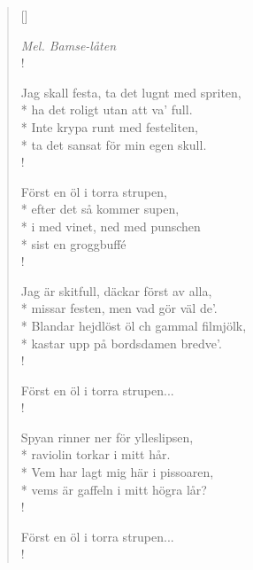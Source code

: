
\settowidth{\versewidth}{Inte krypa runt med festeliten,}



\begin{verse}[\versewidth]

\flagverse{}
\emph{Mel. Bamse-låten}\\!

Jag skall festa, ta det lugnt med spriten,\\*
ha det roligt utan att va' full.\\*
Inte krypa runt med festeliten,\\*
ta det sansat för min egen skull.\\!


Först en öl i torra strupen,\\*
efter det så kommer supen,\\*
i med vinet, ned med punschen\\*
sist en groggbuffé\\!


Jag är skitfull, däckar först av alla,\\*
missar festen, men vad gör väl de'.\\*
Blandar hejdlöst öl ch gammal filmjölk,\\*
kastar upp på bordsdamen bredve'.\\!


Först en öl i torra strupen...\\!


Spyan rinner ner för ylleslipsen,\\*
raviolin torkar i mitt hår.\\*
Vem har lagt mig här i pissoaren,\\*
vems är gaffeln i mitt högra lår?\\!


Först en öl i torra strupen...\\!




\end{verse}

